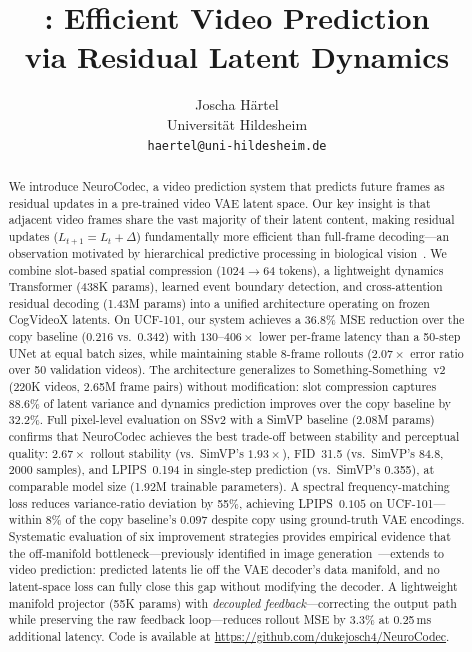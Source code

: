 \documentclass{article}
\title{\method{}: Efficient Video Prediction \\via Residual Latent Dynamics}
\author{
  Joscha H\"artel \\
  Universit\"at Hildesheim \\
  \texttt{haertel@uni-hildesheim.de}
}
\date{}
\newcommand{\method}{NeuroCodec}
\begin{document}
\maketitle

\begin{abstract}
We introduce \method{}, a video prediction system that predicts future
frames as residual updates in a pre-trained video VAE latent space.
Our key insight is that adjacent video frames share the vast majority of
their latent content, making residual updates
($L_{t+1} = L_t + \Delta$) fundamentally more efficient than full-frame
decoding---an observation motivated by hierarchical predictive
processing in biological vision~\cite{rao1999predictive}.
We combine slot-based spatial compression (1024$\to$64 tokens),
a lightweight dynamics Transformer (438K params), learned event boundary
detection, and cross-attention residual decoding (1.43M params) into
a unified architecture operating on frozen CogVideoX latents.
On UCF-101, our system achieves a 36.8\% MSE reduction over the copy
baseline (0.216 vs.\ 0.342) with $130$--$406\times$ lower per-frame
latency than a 50-step UNet at equal batch sizes, while maintaining
stable 8-frame rollouts ($2.07\times$ error ratio over 50 validation
videos).
The architecture generalizes to Something-Something~v2 (220K videos,
2.65M frame pairs) without modification: slot compression captures
88.6\% of latent variance and dynamics prediction improves over the copy
baseline by 32.2\%.
Full pixel-level evaluation on SSv2 with a SimVP baseline (2.08M params)
confirms that \method{} achieves the best trade-off between stability
and perceptual quality: $2.67\times$ rollout stability (vs.\ SimVP's
$1.93\times$), FID~31.5 (vs.\ SimVP's 84.8, 2000 samples), and
LPIPS~0.194 in single-step prediction (vs.\ SimVP's 0.355), at
comparable model size (1.92M trainable parameters).
A spectral frequency-matching loss reduces variance-ratio deviation by
55\%, achieving LPIPS~$0.105$ on UCF-101---within 8\% of the copy
baseline's $0.097$ despite copy using ground-truth VAE encodings.
Systematic evaluation of six improvement strategies provides empirical
evidence that the off-manifold bottleneck---previously identified in
image generation~\cite{zheng2025raedit}---extends to video prediction:
predicted latents lie off the VAE decoder's data manifold, and no
latent-space loss can fully close this gap without modifying the
decoder.
A lightweight manifold projector (55K params) with \emph{decoupled
feedback}---correcting the output path while preserving the raw
feedback loop---reduces rollout MSE by 3.3\% at 0.25\,ms additional
latency.
Code is available at \url{https://github.com/dukejosch4/NeuroCodec}.
\end{abstract}
\end{document}
